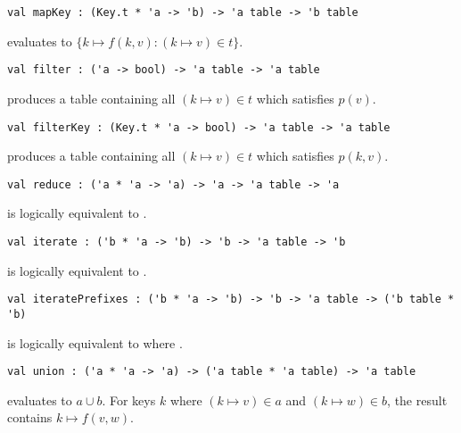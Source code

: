 \begin{gram}[mapKey]
\begin{verbatim}
val mapKey : (Key.t * 'a -> 'b) -> 'a table -> 'b table
\end{verbatim}
 evaluates to $\{k \mapsto f(k, v) : (k \mapsto v) \in t\}$.
\end{gram}

\begin{gram}[filter]
\begin{verbatim}
val filter : ('a -> bool) -> 'a table -> 'a table
\end{verbatim}
 produces a table containing all $(k \mapsto v) \in t$ which
satisfies $p(v)$.
\end{gram}

\begin{gram}[filterKey]
\begin{verbatim}
val filterKey : (Key.t * 'a -> bool) -> 'a table -> 'a table
\end{verbatim}
 produces a table containing all $(k \mapsto v) \in t$ which
satisfies $p(k,v)$.
\end{gram}

\begin{gram}[reduce]
\begin{verbatim}
val reduce : ('a * 'a -> 'a) -> 'a -> 'a table -> 'a
\end{verbatim}
 is logically equivalent to .
\end{gram}

\begin{gram}[iterate]
\begin{verbatim}
val iterate : ('b * 'a -> 'b) -> 'b -> 'a table -> 'b
\end{verbatim}
 is logically equivalent to .
\end{gram}

\begin{gram}[iteratePrefixes]
\begin{verbatim}
val iteratePrefixes : ('b * 'a -> 'b) -> 'b -> 'a table -> ('b table * 'b)
\end{verbatim}
 is logically equivalent to
 where .
\end{gram}

\begin{gram}[union]
\begin{verbatim}
val union : ('a * 'a -> 'a) -> ('a table * 'a table) -> 'a table
\end{verbatim}
 evaluates to $a \cup b$. For keys $k$ where $(k \mapsto v) \in a$
and $(k \mapsto w) \in b$, the result contains $k \mapsto f(v,w)$.
\end{gram}

